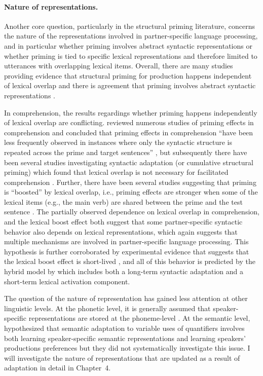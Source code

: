 \paragraph{Nature of representations.} Another core question, particularly in the structural priming literature, concerns
the nature of the representations involved in partner-specific language processing, 
and in particular whether priming involves abstract syntactic representations
or whether priming is tied to specific lexical representations and therefore limited to utterances with overlapping lexical items. 
Overall, there are many studies
providing evidence that structural priming for production happens independent of lexical overlap and there is agreement
that priming involves abstract syntactic representations .

In comprehension, the results regardings whether priming happens independently of lexical overlap are conflicting.
\textcite{Tooley2010} reviewed numerous studies of priming effects in comprehension and concluded that priming effects in comprehension
 ``have been less frequently observed in instances where only the syntactic structure is repeated across the prime and target sentences'' \parencite[][p.928]{Tooley2010},
but subsequently there have been several studies investigating syntactic adaptation (or cumulative structural priming) which found that lexical overlap is not
necessary for facilitated comprehension . Further, there have been several studies suggesting that priming is 
``boosted'' by lexical overlap, i.e., priming effects are stronger when some of the lexical items
(e.g.,  the main verb) are shared between the prime and the test sentence 
.
The partially observed dependence
on lexical overlap in comprehension, and the lexical boost effect both suggest that some partner-specific syntactic behavior also depends on 
lexical representations, which again suggests that multiple mechanisms are involved in partner-specific language processing. This hypothesis
is further corroborated by experimental evidence that suggests that the lexical boost effect is short-lived , and all
of this behavior is predicted by the hybrid model by \textcite{Reitter2011} which includes both a long-term syntactic adaptation and a short-term
lexical activation component.

The question of the nature of representation has gained less attention at other linguistic levels. At the phonetic level, it is generally assumed
that speaker-specific representations are stored at the phoneme-level . At the semantic level, \textcite{Yildirim2016}
hypothesized that semantic adaptation to variable uses of quantifiers  involves both learning speaker-specific semantic representations
and learning speakers' productions preferences but they did not systematically investigate this issue. I will investigate the nature of representations
that are updated as a result of adaptation in detail in Chapter~4.

